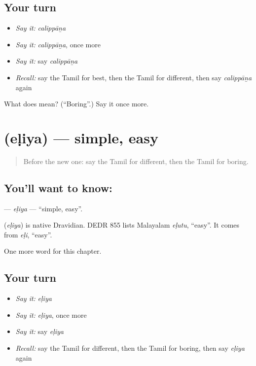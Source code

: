 \subsection*{Your turn}
\begin{itemize}
\raggedright
  \item \emph{Say it:} \emph{calippāṉa}
  \item \emph{Say it:} \emph{calippāṉa}, once more
  \item \emph{Say it:} say \emph{calippāṉa}
  \item \emph{Recall:} say the Tamil for best, then the Tamil for different, then say \emph{calippāṉa} again
\end{itemize}

\begin{tcolorbox}[breakable,colback=teal!4,colframe=teal!35!black,title={Before you move on}]
What does  mean? (\textquotedblleft{}Boring\textquotedblright{}.) Say it once more.
\end{tcolorbox}
\section[\texorpdfstring{\ta{எளிய} (eḷiya)}{எளிய (eḷiya)}]{ (eḷiya) — simple, easy}

\label{lesson:TA-C269-eliya}



\begin{quote}
Before the new one: say the Tamil for different, then the Tamil for boring.
\end{quote}

\subsection*{You'll want to know: }
\textbf{} — \emph{eḷiya} — \textquotedblleft{}simple, easy\textquotedblright{}.

\begin{cousinweb}
\textbf{} (\emph{eḷiya}) is native Dravidian. DEDR 855 lists Malayalam \emph{eḷutu}, \textquotedblleft{}easy\textquotedblright{}. It comes from \emph{eḷi}, \textquotedblleft{}easy\textquotedblright{}.
\end{cousinweb}

\begin{grammarlens}[title={What you've built}]
One more word for this chapter.
\end{grammarlens}

\subsection*{Your turn}
\begin{itemize}
\raggedright
  \item \emph{Say it:} \emph{eḷiya}
  \item \emph{Say it:} \emph{eḷiya}, once more
  \item \emph{Say it:} say \emph{eḷiya}
  \item \emph{Recall:} say the Tamil for different, then the Tamil for boring, then say \emph{eḷiya} again
\end{itemize}

